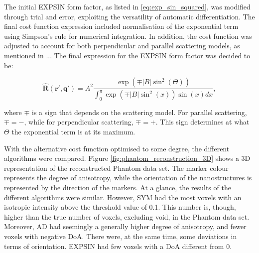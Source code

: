 The initial EXPSIN form factor, as listed in \eqref{eq:exp_sin_squared}, was modified through trial and error, exploiting the versatility of automatic differentiation.
The final cost function expression included normalisation of the exponential term using Simpson's rule for numerical integration.
In addition, the cost function was adjusted to account for both perpendicular and parallel scattering models, as mentioned in ...%
The final expression for the EXPSIN form factor was decided to be:

\begin{equation}
    \label{eq:final_exp_sin_squared}
    \bm{\widehat{R}}(\bm{r'}, \bm{q'}) = A^{2} \frac{\exp\left( \mp |B| \sin^{2}(\Theta) \right)}{\int_{0}^{\pi} \exp\left( \mp |B| \sin^{2}(x) \right) \sin(x) dx},
\end{equation}

where $\mp$ is a sign that depends on the scattering model. For parallel scattering, $\mp = -$, while for perpendicular scattering, $\mp = +$.
This sign determines at what $\Theta$ the exponential term is at its maximum.

With the alternative cost function optimised to some degree, the different algorithms were compared.
Figure \ref{fig:phantom_reconstruction_3D} shows a 3D representation of the reconstructed Phantom data set.
The marker colour represents the degree of anisotropy, while the orientation of the nanostructures is represented by the direction of the markers.
At a glance, the results of the different algorithms were similar.
However, SYM had the most voxels with an isotropic intensity above the threshold value of 0.1.
This number is, though, higher than the true number of voxels, excluding void, in the Phantom data set.
Moreover, AD had seemingly a generally higher degree of anisotropy, and fewer voxels with negative DoA.
There were, at the same time, some deviations in terms of orientation.
EXPSIN had few voxels with a DoA different from 0.

